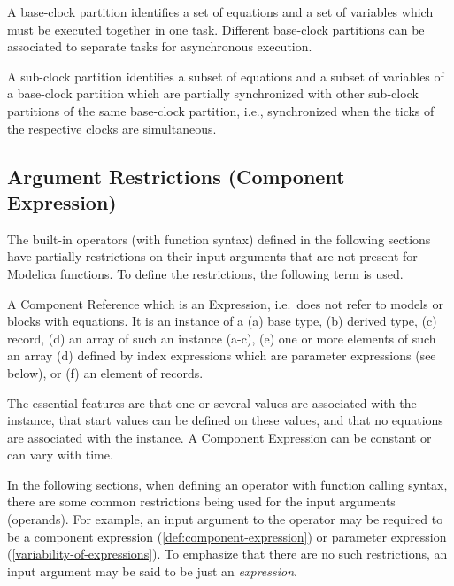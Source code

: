 \begin{definition}
A base-clock partition identifies a set of equations and a set of variables which must be executed together in one task.  Different base-clock partitions can be associated to separate tasks for
asynchronous execution.
\end{definition}

\begin{definition}
A sub-clock partition identifies a subset of equations and a subset of variables of a base-clock partition which are partially synchronized with other sub-clock partitions of the same base-clock
partition, i.e., synchronized when the ticks of the respective clocks are simultaneous.
\end{definition}

\subsection{Argument Restrictions (Component Expression)}\label{argument-restrictions-component-expression}

The built-in operators (with function syntax) defined in the following
sections have partially restrictions on their input arguments that are
not present for Modelica functions. To define the restrictions, the
following term is used.

\begin{definition}\label{def:component-expression}
A Component Reference which is an Expression, i.e.\ does not refer to models or blocks with equations.  It is an instance of a (a) base type, (b) derived type, (c) record, (d) an array of such an
instance (a-c), (e) one or more elements of such an array (d) defined by index expressions which are parameter expressions (see below), or (f) an element of records.
\begin{nonnormative}
The essential features are that one or several values are associated with the instance, that start values can be defined on these values, and that no equations are associated with the instance.
A Component Expression can be constant or can vary with time.
\end{nonnormative}
\end{definition}

In the following sections, when defining an operator with function calling syntax, there are some common restrictions being used for the input arguments (operands).  For example, an input argument to the operator may be required to be a component expression (\cref{def:component-expression}) or parameter expression (\cref{variability-of-expressions}).  To emphasize that there are no such restrictions, an input argument may be said to be just an \emph{expression}.

